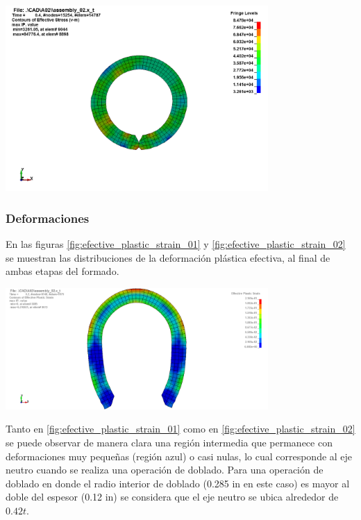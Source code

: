\begin{center}
\includegraphics[width=0.75\textwidth]{src/ch4/von_mises_02.png}
\label{fig:von_mises_02}
\end{center}


\subsubsection{Deformaciones}

En las figuras \ref{fig:efective_plastic_strain_01} y \ref{fig:efective_plastic_strain_02} se muestran 
las distribuciones de la deformación plástica efectiva, al final de ambas etapas del formado. 

\begin{center}
\includegraphics[width=0.75\textwidth]{src/ch4/efective_plastic_strain_01.png}
\label{fig:efective_plastic_strain_01}
\end{center}

Tanto en \ref{fig:efective_plastic_strain_01} como en \ref{fig:efective_plastic_strain_02} se puede observar 
de manera clara una región intermedia que permanece con deformaciones muy pequeñas (región azul) o casi nulas, 
lo cual corresponde al eje neutro cuando se realiza una operación de doblado. Para una operación de doblado 
en donde el radio interior de doblado (0.285 in en este caso) es mayor al doble del espesor (0.12 in) se 
considera que el eje neutro se ubica alrededor de $0.42t$.

